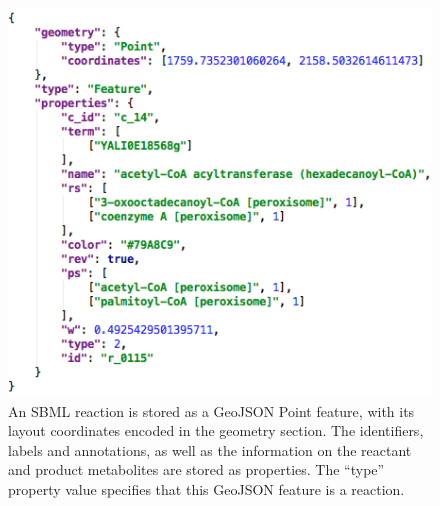 \documentclass{bmcart}
\begin{document}
\begin{backmatter}
\begin{figure}[h!]
\includegraphics[scale=0.5]{figure2.png}
  \caption{
  \label{fig:geojson}
      An SBML reaction is stored as a GeoJSON Point feature, with its layout coordinates encoded in the geometry section. The identifiers, labels and annotations, as well as the information on the reactant and product metabolites are stored as properties. The ``type'' property value specifies that this GeoJSON feature is a reaction.}
      \end{figure}
      

\end{backmatter}
\end{document}
